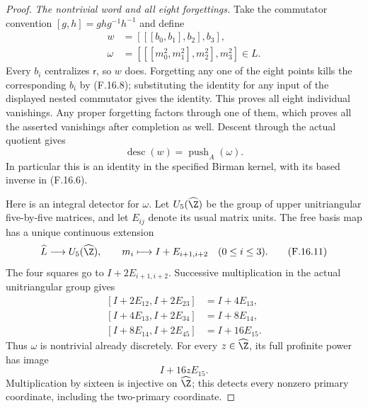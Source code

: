 \begin{proof}
\emph{The nontrivial word and all eight forgettings.}
Take the commutator convention
$[g,h]=ghg^{-1}h^{-1}$ and define
\[
 \begin{split}
 w&=[[[b_0,b_1],b_2],b_3],\\
 \omega&=[[[m_0^2,m_1^2],m_2^2],m_3^2]\in L .
 \end{split}                                                    \tag{F.16.9}
\]
Every $b_i$ centralizes $\mathsf r$, so $w$
does.  Forgetting any one of the eight
points kills the corresponding $b_i$
by (F.16.8); substituting the identity
for any input of the displayed nested
commutator gives the identity.
This proves all eight individual
vanishings.  Any proper forgetting factors
through one of them, which proves all
the asserted vanishings after completion
as well.
Descent through the actual quotient gives
\[
             \operatorname{desc}(w)
                       =\operatorname{push}_A(\omega).
                                                               \tag{F.16.10}
\]
In particular this is an identity in the
specified Birman kernel, with its based
inverse in (F.16.6).

Here is an integral detector for $\omega$.
Let $U_5(\widehat\Z)$ be the group of
upper unitriangular five-by-five matrices,
and let $E_{ij}$ denote its usual matrix
units.  The free basis map has a unique
continuous extension
\[
 \widehat L\longrightarrow U_5(\widehat\Z),
       \qquad m_i\longmapsto I+E_{i+1,i+2}
                              \quad(0\leq i\leq3).
                                                               \tag{F.16.11}
\]
The four squares go to $I+2E_{i+1,i+2}$.
Successive multiplication in the actual
unitriangular group gives
\[
 \begin{split}
 [I+2E_{12},I+2E_{23}]&=I+4E_{13},\\
 [I+4E_{13},I+2E_{34}]&=I+8E_{14},\\
 [I+8E_{14},I+2E_{45}]&=I+16E_{15}.
 \end{split}                                                    \tag{F.16.12}
\]
Thus $\omega$ is nontrivial already
discretely.  For every $z\in\widehat\Z$,
its full profinite power has image
\[
                         I+16zE_{15}.                          \tag{F.16.13}
\]
Multiplication by sixteen is injective
on $\widehat\Z$; this detects every
nonzero primary coordinate, including
the two-primary coordinate.


\end{proof}
